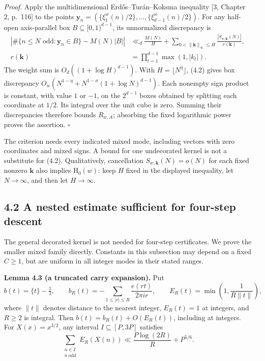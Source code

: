 \documentclass[11pt,a4paper]{article}
\begin{document}
\emph{Proof.} Apply the multidimensional Erd\H{o}s--Tur\'{a}n--Koksma
inequality {[}3, Chapter 2, p.~116{]} to the points
\(\mathbf y_n=(\{\xi_1^w(n)/2\},\ldots,\{\xi_{d-1}^w(n)/2\})\). For any
half-open axis-parallel box \(B\subseteq[0,1)^{d-1}\), its unnormalized
discrepancy is \[
\begin{split}
\left|\#\{n\le N\text{ odd}:\mathbf y_n\in B\}-M(N)|B|\right|
&\ll_d \frac{M(N)}{H}
+\sum_{0<\|\mathbf k\|_\infty\le H}
\frac{|S_{w,\mathbf k}(N)|}{r(\mathbf k)},\\
r(\mathbf k)&=\prod_{t=1}^{d-1}\max(1,|k_t|).
\end{split}
\] The weight sum is \(O_d((1+\log H)^{d-1})\). With
\(H=\lfloor N^\eta\rfloor\), (4.2) gives box discrepancy
\(O_w(N^{1-\eta}+N^{1-\sigma}(1+\log N)^{d-1})\). Each nonempty sign
product is constant, with value \(1\) or \(-1\), on the \(2^{d-1}\)
boxes obtained by splitting each coordinate at \(1/2\). Its integral
over the unit cube is zero. Summing their discrepancies therefore bounds
\(R_{w,A}\); absorbing the fixed logarithmic power proves the assertion.
\(\square\)

The criterion needs every indicated mixed mode, including vectors with
zero coordinates and mixed signs. A bound for one undecorated kernel is
not a substitute for (4.2). Qualitatively, cancellation
\(S_{w,\mathbf k}(N)=o(N)\) for each fixed nonzero \(\mathbf k\) also
implies \(\mathrm H_0(w)\): keep \(H\) fixed in the displayed
inequality, let \(N\to\infty\), and then let \(H\to\infty\).

\subsection{4.2 A nested estimate sufficient for four-step
descent}\label{a-nested-estimate-sufficient-for-four-step-descent}

The general decorated kernel is not needed for four-step certificates.
We prove the smaller mixed family directly. Constants in this subsection
may depend on a fixed \(C\ge1\), but are uniform in all integer modes in
their stated ranges.


\textbf{Lemma 4.3 (a truncated carry expansion).} Put \[
b(t)=\{t\}-\tfrac12,\qquad
b_R(t)=-\sum_{1\le |r|\le R}\frac{e(rt)}{2\pi i r},\qquad
E_R(t)=\min\left(1,\frac1{R\|t\|}\right),
\] where \(\|t\|\) denotes distance to the nearest integer, \(E_R(t)=1\)
at integers, and \(R\ge2\) is integral. Then \(b(t)=b_R(t)+O(E_R(t))\),
including at integers. For \(X(x)=x^{3/2}\), any interval
\(I\subseteq[P,3P]\) satisfies \[
\sum_{\substack{n\in I\\n\ \mathrm{odd}}}E_R(X(n))
\ll \frac{P\log(2R)}R+P^{5/6}.
\tag{4.3}
\]
\end{document}
